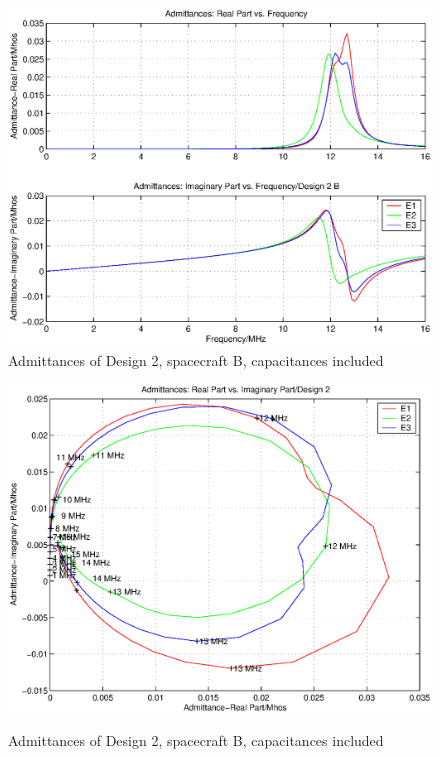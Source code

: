 \documentclass[a4paper,14pt]{extbook}
\begin{document}
\begin{figure}
\begin{center}
\includegraphics[scale=0.65]{AdmittancesD2B1_caps.eps}\\
\caption{Admittances of Design 2, spacecraft B, capacitances included} \label{fig_Admittance1_D2B_caps}
\includegraphics[scale=0.65]{AdmittancesD2B2_caps.eps} \\
\caption{Admittances of Design 2, spacecraft B, capacitances included} \label{fig_Admittance2_D2B_caps}
\end{center}
\end{figure}
\end{document}
